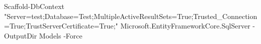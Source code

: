 


Scaffold-DbContext "Server=test;Database=Test;MultipleActiveResultSets=True;Trusted_Connection=True;TrustServerCertificate=True;" Microsoft.EntityFrameworkCore.SqlServer -OutputDir Models -Force
